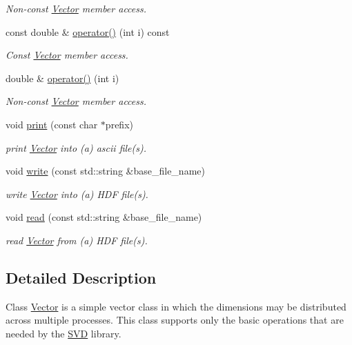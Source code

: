 \begin{DoxyCompactItemize}
\begin{DoxyCompactList}\small\item\em Non-\/const \hyperlink{class_c_a_r_o_m_1_1_vector}{Vector} member access. \end{DoxyCompactList}\item 
const double \& \hyperlink{class_c_a_r_o_m_1_1_vector_a0395f0c266a3e237573b3a8c483f2693}{operator()} (int i) const 
\begin{DoxyCompactList}\small\item\em Const \hyperlink{class_c_a_r_o_m_1_1_vector}{Vector} member access. \end{DoxyCompactList}\item 
double \& \hyperlink{class_c_a_r_o_m_1_1_vector_af30be05120dabaa00932c9276df5d55c}{operator()} (int i)
\begin{DoxyCompactList}\small\item\em Non-\/const \hyperlink{class_c_a_r_o_m_1_1_vector}{Vector} member access. \end{DoxyCompactList}\item 
void \hyperlink{class_c_a_r_o_m_1_1_vector_a73fc052af63b99e06e9315c72727a0ee}{print} (const char $\ast$prefix)
\begin{DoxyCompactList}\small\item\em print \hyperlink{class_c_a_r_o_m_1_1_vector}{Vector} into (a) ascii file(s). \end{DoxyCompactList}\item 
void \hyperlink{class_c_a_r_o_m_1_1_vector_a8eeaff9eedc7ab261577670e98f356c3}{write} (const std\-::string \&base\-\_\-file\-\_\-name)
\begin{DoxyCompactList}\small\item\em write \hyperlink{class_c_a_r_o_m_1_1_vector}{Vector} into (a) H\-D\-F file(s). \end{DoxyCompactList}\item 
void \hyperlink{class_c_a_r_o_m_1_1_vector_a2b38fbc6b7d898bcc0399e1380a436d3}{read} (const std\-::string \&base\-\_\-file\-\_\-name)
\begin{DoxyCompactList}\small\item\em read \hyperlink{class_c_a_r_o_m_1_1_vector}{Vector} from (a) H\-D\-F file(s). \end{DoxyCompactList}\end{DoxyCompactItemize}


\subsection{Detailed Description}
Class \hyperlink{class_c_a_r_o_m_1_1_vector}{Vector} is a simple vector class in which the dimensions may be distributed across multiple processes. This class supports only the basic operations that are needed by the \hyperlink{class_c_a_r_o_m_1_1_s_v_d}{S\-V\-D} library. 

